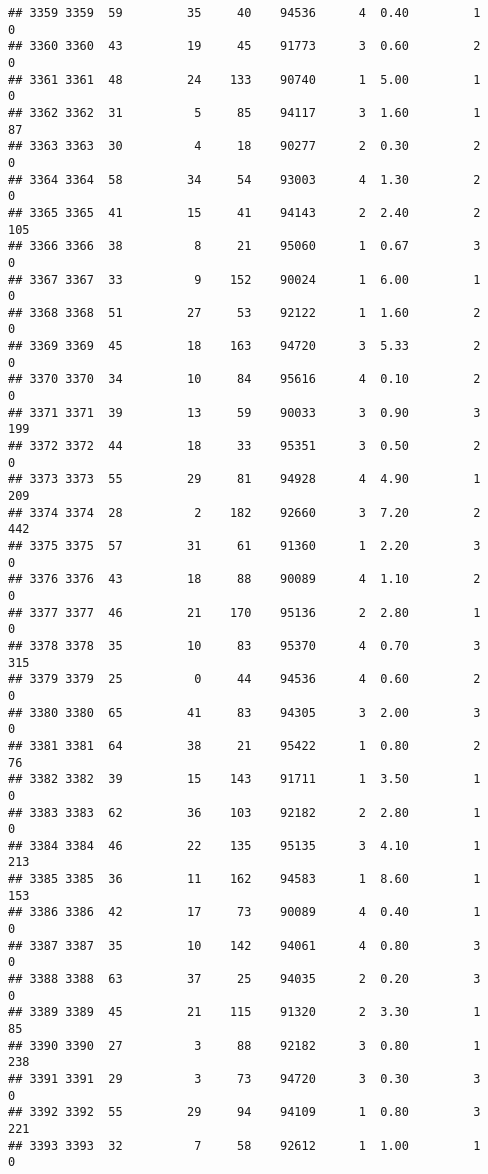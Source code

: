 \documentclass[
]{article}
\begin{document}
\begin{verbatim}
## 3359 3359  59         35     40    94536      4  0.40         1        0
## 3360 3360  43         19     45    91773      3  0.60         2        0
## 3361 3361  48         24    133    90740      1  5.00         1        0
## 3362 3362  31          5     85    94117      3  1.60         1       87
## 3363 3363  30          4     18    90277      2  0.30         2        0
## 3364 3364  58         34     54    93003      4  1.30         2        0
## 3365 3365  41         15     41    94143      2  2.40         2      105
## 3366 3366  38          8     21    95060      1  0.67         3        0
## 3367 3367  33          9    152    90024      1  6.00         1        0
## 3368 3368  51         27     53    92122      1  1.60         2        0
## 3369 3369  45         18    163    94720      3  5.33         2        0
## 3370 3370  34         10     84    95616      4  0.10         2        0
## 3371 3371  39         13     59    90033      3  0.90         3      199
## 3372 3372  44         18     33    95351      3  0.50         2        0
## 3373 3373  55         29     81    94928      4  4.90         1      209
## 3374 3374  28          2    182    92660      3  7.20         2      442
## 3375 3375  57         31     61    91360      1  2.20         3        0
## 3376 3376  43         18     88    90089      4  1.10         2        0
## 3377 3377  46         21    170    95136      2  2.80         1        0
## 3378 3378  35         10     83    95370      4  0.70         3      315
## 3379 3379  25          0     44    94536      4  0.60         2        0
## 3380 3380  65         41     83    94305      3  2.00         3        0
## 3381 3381  64         38     21    95422      1  0.80         2       76
## 3382 3382  39         15    143    91711      1  3.50         1        0
## 3383 3383  62         36    103    92182      2  2.80         1        0
## 3384 3384  46         22    135    95135      3  4.10         1      213
## 3385 3385  36         11    162    94583      1  8.60         1      153
## 3386 3386  42         17     73    90089      4  0.40         1        0
## 3387 3387  35         10    142    94061      4  0.80         3        0
## 3388 3388  63         37     25    94035      2  0.20         3        0
## 3389 3389  45         21    115    91320      2  3.30         1       85
## 3390 3390  27          3     88    92182      3  0.80         1      238
## 3391 3391  29          3     73    94720      3  0.30         3        0
## 3392 3392  55         29     94    94109      1  0.80         3      221
## 3393 3393  32          7     58    92612      1  1.00         1        0

\end{verbatim}
\end{document}
